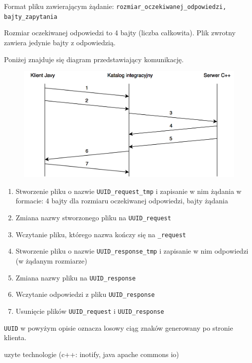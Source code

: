 Format pliku zawierającym żądanie:
\newline
\texttt{rozmiar\_oczekiwanej\_odpowiedzi, bajty\_zapytania}

Rozmiar oczekiwanej odpowiedzi to 4 bajty (liczba całkowita). Plik zwrotny zawiera jedynie bajty z odpowiedzią.

Poniżej znajduje się diagram przedstawiający komunikację.

\begin{figure}[h!]
    \centering
    \includegraphics[width=\textwidth,height=\textheight,keepaspectratio]{img/files_impl_diagram.png}
    \caption{}
\end{figure}

\begin{enumerate}
    \item Stworzenie pliku o nazwie \texttt{UUID\_request\_tmp} i zapisanie w nim żądania w formacie: 4 bajty dla rozmiaru oczekiwanej odpowiedzi, bajty żądania
    \item Zmiana nazwy stworzonego pliku na \texttt{UUID\_request}
    \item Wczytanie pliku, którego nazwa kończy się na \texttt{\_request}
    \item Stworzenie pliku o nazwie \texttt{UUID\_response\_tmp} i zapisanie w nim odpowiedzi (w żądanym rozmiarze)
    \item Zmiana nazwy pliku na \texttt{UUID\_response}
    \item Wczytanie odpowiedzi z pliku \texttt{UUID\_response}
    \item Usunięcie plików \texttt{UUID\_request} i \texttt{UUID\_response}
\end{enumerate}

\texttt{UUID} w powyżym opisie oznacza losowy ciąg znaków generowany po stronie klienta.

uzyte technologie (c++: inotify, java apache commons io)


